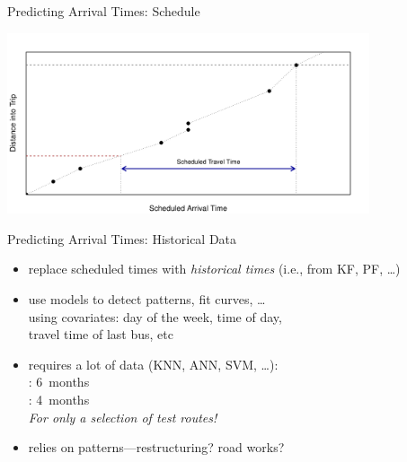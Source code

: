 \documentclass[10pt,t]{beamer}
\begin{document}
\begin{frame}{Predicting Arrival Times: Schedule}
\begin{overprint}
    \centering
    \includegraphics[width=0.8\textwidth]{figs/pred-sched-frame4.pdf}
  \end{overprint}

  \onslide<+->
\end{frame}


\begin{frame}{Predicting Arrival Times: Historical Data}
  \onslide<+->

  \begin{itemize}
  \item replace scheduled times with \emph{historical times}
    (i.e., from KF, PF, \ldots)
  \item use models to detect patterns, fit curves, \ldots\\
    using covariates: day of the week, time of day,\\
    \alert{travel time of last bus}, etc
  \item<+-> requires a lot of data (KNN, ANN, SVM, \ldots):\\
    \cite{mazloumi-etal:2011}: 6~months\\
    \cite{chen-rakha:2014}: 4~months \\
    \emph{For only a selection of test routes!}
  \item<+-> relies on patterns---restructuring? road works?
  \end{itemize}
\end{frame}
\end{document}
